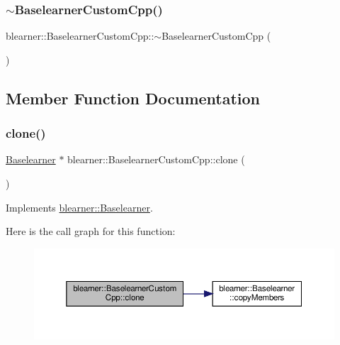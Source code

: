 \subsubsection{\texorpdfstring{$\sim$\+Baselearner\+Custom\+Cpp()}{~BaselearnerCustomCpp()}}
{\footnotesize\ttfamily blearner\+::\+Baselearner\+Custom\+Cpp\+::$\sim$\+Baselearner\+Custom\+Cpp (\begin{DoxyParamCaption}{ }\end{DoxyParamCaption})}



\subsection{Member Function Documentation}
\mbox{\label{classblearner_1_1_baselearner_custom_cpp_a8478407ac4d8ed118fd1381f65df150a}} 
\subsubsection{\texorpdfstring{clone()}{clone()}}
{\footnotesize\ttfamily \hyperlink{classblearner_1_1_baselearner}{Baselearner} $\ast$ blearner\+::\+Baselearner\+Custom\+Cpp\+::clone (\begin{DoxyParamCaption}{ }\end{DoxyParamCaption})\hspace{0.3cm}{\ttfamily [virtual]}}



Implements \hyperlink{classblearner_1_1_baselearner_a8e12c6739f085917a7d2da6570c51a21}{blearner\+::\+Baselearner}.

Here is the call graph for this function\+:
\nopagebreak
\begin{figure}[H]
\begin{center}
\leavevmode
\includegraphics[width=350pt]{classblearner_1_1_baselearner_custom_cpp_a8478407ac4d8ed118fd1381f65df150a_cgraph}
\end{center}
\end{figure}
\mbox{\label{classblearner_1_1_baselearner_custom_cpp_ae130d3b469eff32c8e0be12d925cf88f}} 
